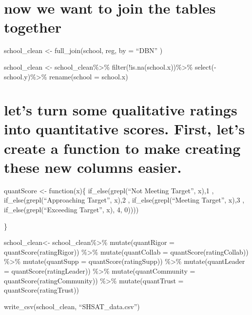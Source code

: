 \documentclass[]{article}
\begin{document}
\section{now we want to join the tables
together}\label{now-we-want-to-join-the-tables-together}

school\_clean \textless{}- full\_join(school, reg, by = ``DBN'' )

school\_clean \textless{}- school\_clean\%\textgreater{}\%
filter(!is.na(school.x))\%\textgreater{}\%
select(-school.y)\%\textgreater{}\% rename(school = school.x)

\section{let's turn some qualitative ratings into quantitative scores.
First, let's create a function to make creating these new columns
easier.}\label{lets-turn-some-qualitative-ratings-into-quantitative-scores.-first-lets-create-a-function-to-make-creating-these-new-columns-easier.}

quantScore \textless{}- function(x)\{ if\_else(grepl(``Not Meeting
Target'', x),1 , if\_else(grepl(``Approaching Target'', x),2 ,
if\_else(grepl(``Meeting Target'', x),3 , if\_else(grepl(``Exceeding
Target'', x), 4, 0))))

\}

school\_clean\textless{}- school\_clean\%\textgreater{}\%
mutate(quantRigor = quantScore(ratingRigor)) \%\textgreater{}\%
mutate(quantCollab = quantScore(ratingCollab)) \%\textgreater{}\%
mutate(quantSupp = quantScore(ratingSupp)) \%\textgreater{}\%
mutate(quantLeader = quantScore(ratingLeader)) \%\textgreater{}\%
mutate(quantCommunity = quantScore(ratingCommunity)) \%\textgreater{}\%
mutate(quantTrust = quantScore(ratingTrust))

write\_csv(school\_clean, ``SHSAT\_data.csv'')
\end{document}
